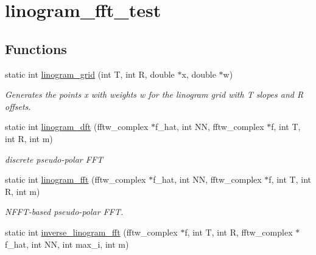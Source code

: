 \hypertarget{group__applications__polarFFT__linogramm}{
\section{linogram\_\-fft\_\-test}
\label{group__applications__polarFFT__linogramm}
}
\subsection*{Functions}
\begin{CompactItemize}
\item 
\hypertarget{group__applications__polarFFT__linogramm_g9a5ff165ab1e23af77ab6f6108bb6310}{
static int \hyperlink{group__applications__polarFFT__linogramm_g9a5ff165ab1e23af77ab6f6108bb6310}{linogram\_\-grid} (int T, int R, double $\ast$x, double $\ast$w)}
\label{group__applications__polarFFT__linogramm_g9a5ff165ab1e23af77ab6f6108bb6310}

\begin{CompactList}\small\item\em Generates the points x with weights w for the linogram grid with T slopes and R offsets. \item\end{CompactList}\item 
\hypertarget{group__applications__polarFFT__linogramm_g708f5c41add2af92a97339dee1c068dc}{
static int \hyperlink{group__applications__polarFFT__linogramm_g708f5c41add2af92a97339dee1c068dc}{linogram\_\-dft} (fftw\_\-complex $\ast$f\_\-hat, int NN, fftw\_\-complex $\ast$f, int T, int R, int m)}
\label{group__applications__polarFFT__linogramm_g708f5c41add2af92a97339dee1c068dc}

\begin{CompactList}\small\item\em discrete pseudo-polar FFT \item\end{CompactList}\item 
\hypertarget{group__applications__polarFFT__linogramm_gea5025fe751ace25f818ecb3cfc16444}{
static int \hyperlink{group__applications__polarFFT__linogramm_gea5025fe751ace25f818ecb3cfc16444}{linogram\_\-fft} (fftw\_\-complex $\ast$f\_\-hat, int NN, fftw\_\-complex $\ast$f, int T, int R, int m)}
\label{group__applications__polarFFT__linogramm_gea5025fe751ace25f818ecb3cfc16444}

\begin{CompactList}\small\item\em NFFT-based pseudo-polar FFT. \item\end{CompactList}\item 
\hypertarget{group__applications__polarFFT__linogramm_gf44988058d3000a477c046c172c26265}{
static int \hyperlink{group__applications__polarFFT__linogramm_gf44988058d3000a477c046c172c26265}{inverse\_\-linogram\_\-fft} (fftw\_\-complex $\ast$f, int T, int R, fftw\_\-complex $\ast$f\_\-hat, int NN, int max\_\-i, int m)}
\label{group__applications__polarFFT__linogramm_gf44988058d3000a477c046c172c26265}


\end{CompactItemize}

